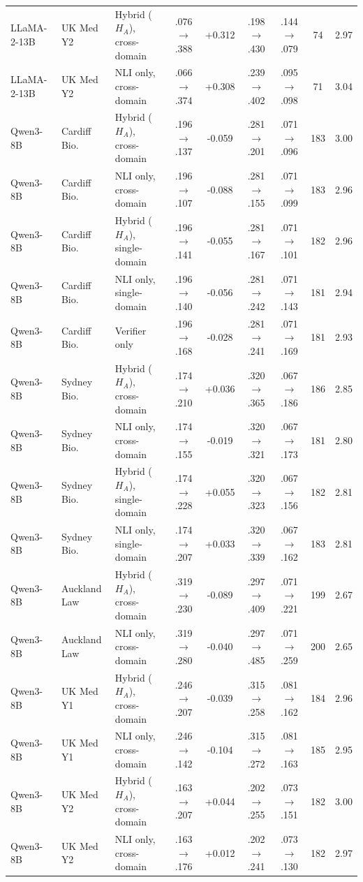 \begin{table}[h]
{\begin{tabular}{lllcccccc}
\midrule
LLaMA-2-13B & UK Med Y2 & Hybrid ($H_A$), cross-domain & .076$\to$.388 & +0.312 & .198$\to$.430 & .144$\to$.079 & 74 & 2.97 \\
LLaMA-2-13B & UK Med Y2 & NLI only, cross-domain & .066$\to$.374 & +0.308 & .239$\to$.402 & .095$\to$.098 & 71 & 3.04 \\
\midrule
Qwen3-8B & Cardiff Bio. & Hybrid ($H_A$), cross-domain & .196$\to$.137 & -0.059 & .281$\to$.201 & .071$\to$.096 & 183 & 3.00 \\
Qwen3-8B & Cardiff Bio. & NLI only, cross-domain & .196$\to$.107 & -0.088 & .281$\to$.155 & .071$\to$.099 & 183 & 2.96 \\
Qwen3-8B & Cardiff Bio. & Hybrid ($H_A$), single-domain & .196$\to$.141 & -0.055 & .281$\to$.167 & .071$\to$.101 & 182 & 2.96 \\
Qwen3-8B & Cardiff Bio. & NLI only, single-domain & .196$\to$.140 & -0.056 & .281$\to$.242 & .071$\to$.143 & 181 & 2.94 \\
Qwen3-8B & Cardiff Bio. & Verifier only & .196$\to$.168 & -0.028 & .281$\to$.241 & .071$\to$.169 & 181 & 2.93 \\
\midrule
Qwen3-8B & Sydney Bio. & Hybrid ($H_A$), cross-domain & .174$\to$.210 & +0.036 & .320$\to$.365 & .067$\to$.186 & 186 & 2.85 \\
Qwen3-8B & Sydney Bio. & NLI only, cross-domain & .174$\to$.155 & -0.019 & .320$\to$.321 & .067$\to$.173 & 181 & 2.80 \\
Qwen3-8B & Sydney Bio. & Hybrid ($H_A$), single-domain & .174$\to$.228 & +0.055 & .320$\to$.323 & .067$\to$.156 & 182 & 2.81 \\
Qwen3-8B & Sydney Bio. & NLI only, single-domain & .174$\to$.207 & +0.033 & .320$\to$.339 & .067$\to$.162 & 183 & 2.81 \\
\midrule
Qwen3-8B & Auckland Law & Hybrid ($H_A$), cross-domain & .319$\to$.230 & -0.089 & .297$\to$.409 & .071$\to$.221 & 199 & 2.67 \\
Qwen3-8B & Auckland Law & NLI only, cross-domain & .319$\to$.280 & -0.040 & .297$\to$.485 & .071$\to$.259 & 200 & 2.65 \\
\midrule
Qwen3-8B & UK Med Y1 & Hybrid ($H_A$), cross-domain & .246$\to$.207 & -0.039 & .315$\to$.258 & .081$\to$.162 & 184 & 2.96 \\
Qwen3-8B & UK Med Y1 & NLI only, cross-domain & .246$\to$.142 & -0.104 & .315$\to$.272 & .081$\to$.163 & 185 & 2.95 \\
\midrule
Qwen3-8B & UK Med Y2 & Hybrid ($H_A$), cross-domain & .163$\to$.207 & +0.044 & .202$\to$.255 & .073$\to$.151 & 182 & 3.00 \\
Qwen3-8B & UK Med Y2 & NLI only, cross-domain & .163$\to$.176 & +0.012 & .202$\to$.241 & .073$\to$.130 & 182 & 2.97 \\
\bottomrule
\end{tabular}}
\end{table}
